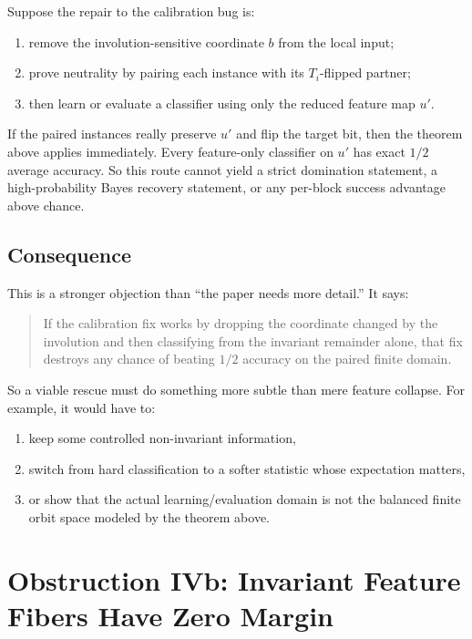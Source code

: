 \documentclass[11pt]{article}
\theoremstyle{remark}
\begin{document}
Suppose the repair to the calibration bug is:
\begin{enumerate}[leftmargin=1.5em]
  \item remove the involution-sensitive coordinate \(b\) from the local input;
  \item prove neutrality by pairing each instance with its \(T_i\)-flipped partner;
  \item then learn or evaluate a classifier using only the reduced feature map \(u'\).
\end{enumerate}

If the paired instances really preserve \(u'\) and flip the target bit, then the theorem above
applies immediately.  Every feature-only classifier on \(u'\) has exact \(1/2\) average accuracy.
So this route cannot yield a strict domination statement, a high-probability Bayes recovery
statement, or any per-block success advantage above chance.

\subsection{Consequence}

This is a stronger objection than ``the paper needs more detail.''  It says:

\begin{quote}
If the calibration fix works by dropping the coordinate changed by the involution and then
classifying from the invariant remainder alone, that fix destroys any chance of beating
\(1/2\) accuracy on the paired finite domain.
\end{quote}

So a viable rescue must do something more subtle than mere feature collapse.  For example, it
would have to:
\begin{enumerate}[leftmargin=1.5em]
  \item keep some controlled non-invariant information,
  \item switch from hard classification to a softer statistic whose expectation matters,
  \item or show that the actual learning/evaluation domain is not the balanced finite orbit space
  modeled by the theorem above.
\end{enumerate}

\section{Obstruction IVb: Invariant Feature Fibers Have Zero Margin}
\end{document}
